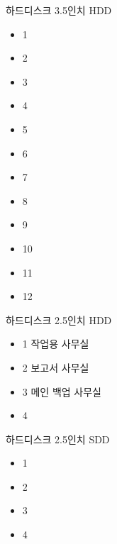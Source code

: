 \documentclass[aspectratio=1610,20pt,xcolor=pdftex,dvipsnames,table,handout]{beamer}
\begin{document}
		\begin{frame} [t,plain]

			\begin{block} {하드디스크 3.5인치 HDD }
			\setlength{\leftmargini}{2em}			
			\begin{itemize}
				\item 1 \hrulefill 
				\item 2	\hrulefill 
				\item 3	\hrulefill 
				\item 4	\hrulefill 
				\item 5 	\hrulefill 
				\item 6	\hrulefill 
				\item 7	\hrulefill 
				\item 8	\hrulefill 
				\item 9  \hrulefill 
				\item 10		\hrulefill 
				\item 11		\hrulefill 
				\item 12		\hrulefill 

			\end{itemize}
			\end{block}						

		\end{frame}						


		\begin{frame} [t,plain]

			\begin{block} {하드디스크 2.5인치 HDD }
			\setlength{\leftmargini}{2em}			
			\begin{itemize}
				\item 1 작업용 		\hrulefill 사무실
				\item 2	보고서		\hrulefill  사무실
				\item 3	메인 백업	\hrulefill 	 사무실 
				\item 4
			\end{itemize}
			\end{block}			
			
		\end{frame}						



		\begin{frame} [t,plain]

			\begin{block} {하드디스크 2.5인치 SDD }
			\setlength{\leftmargini}{2em}			
			\begin{itemize}
				\item 1 
				\item 2	
				\item 3	
				\item 4
			\end{itemize}
			\end{block}						
			
		\end{frame}						
\end{document}
